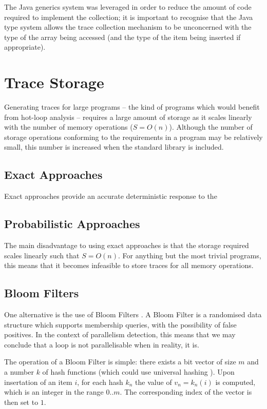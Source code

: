 The Java generics system was leveraged in order to reduce the amount of code required to implement the collection; it is important to recognise that the Java type system allows the trace collection mechanism to be unconcerned with the type of the array being accessed (and the type of the item being inserted if appropriate).

\section{Trace Storage} \label{sec:runtime/storage}
Generating traces for large programs -- the kind of programs which would benefit from hot-loop analysis -- requires a large amount of storage as it scales linearly with the number of memory operations ($S=O(n)$). Although the number of storage operations conforming to the requirements in a program may be relatively small, this number is increased when the standard library is included.
	
	\subsection{Exact Approaches} \label{sec:runtime/storage/exact}
	Exact approaches provide an accurate deterministic response to the 

	\subsection{Probabilistic Approaches} \label{sec:runtime/storage/probabilistic}
	The main disadvantage to using exact approaches is that the storage required scales linearly such that $S=O(n)$. For anything but the most trivial programs, this means that it becomes infeasible to store traces for all memory operations.
	
		\subsection{Bloom Filters} \label{sec:runtime/storage/probabilistic/bloom}
		One alternative is the use of Bloom Filters \citep{Bloom1970}. A Bloom Filter is a randomised data structure which supports membership queries, with the possibility of false positives. In the context of parallelism detection, this means that we may conclude that a loop is not parallelisable when in reality, it is.
		
		The operation of a Bloom Filter is simple: there exists a bit vector of size $m$ and a number $k$ of hash functions (which could use universal hashing \citep{Carter1979}). Upon insertation of an item $i$, for each hash $k_n$ the value of $v_n=k_n(i)$ is computed, which is an integer in the range $0..m$. The corresponding index of the vector is then set to $1$.
		
